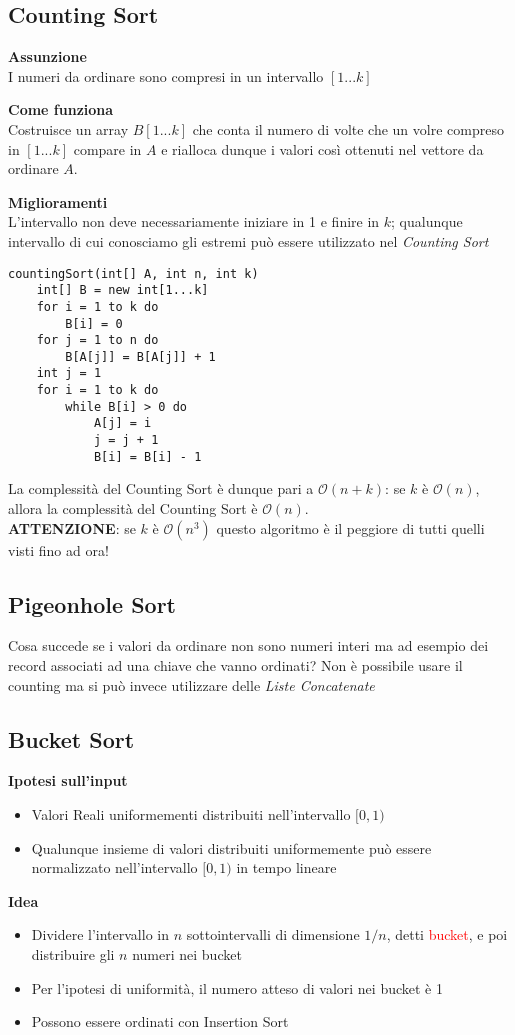 \documentclass[../cheatSheetAlgoritmi.tex]{subfiles}
\begin{document}
\subsection{Counting Sort}
\textbf{Assunzione}\\
I numeri da ordinare sono compresi in un intervallo $[1...k]$

\bigskip
\textbf{Come funziona}\\
Costruisce un array $B[1...k]$ che conta il numero di volte che un volre compreso in $[1...k]$ compare in $A$ e rialloca dunque i valori così ottenuti nel vettore da ordinare $A$.

\bigskip
\textbf{Miglioramenti}\\
L'intervallo non deve necessariamente iniziare in 1 e finire in $k$; qualunque intervallo di cui conosciamo gli estremi può essere utilizzato nel \emph{Counting Sort}
\begin{lstlisting}[caption=Counting Sort]
countingSort(int[] A, int n, int k)
	int[] B = new int[1...k]
	for i = 1 to k do
		B[i] = 0
	for j = 1 to n do
		B[A[j]] = B[A[j]] + 1
	int j = 1
	for i = 1 to k do
		while B[i] > 0 do
			A[j] = i
			j = j + 1
			B[i] = B[i] - 1
\end{lstlisting}
La complessità del Counting Sort è dunque pari a $\mathcal{O}(n + k)$: se $k$ è $\mathcal{O}(n)$, allora la complessità del Counting Sort è $\mathcal{O}(n)$.\\
\textbf{ATTENZIONE}: se $k$ è $\mathcal{O}(n^{3})$ questo algoritmo è il peggiore di tutti quelli visti fino ad ora!

\subsection{Pigeonhole Sort}
Cosa succede se i valori da ordinare non sono numeri interi ma ad esempio dei record associati ad una chiave che vanno ordinati? Non è possibile usare il counting ma si può invece utilizzare delle \emph{Liste Concatenate}

\subsection{Bucket Sort}
\textbf{Ipotesi sull'input}
\begin{itemize}
	\item Valori Reali uniformementi distribuiti nell'intervallo $[0, 1)$
	\item Qualunque insieme di valori distribuiti uniformemente può essere normalizzato nell'intervallo $[0, 1)$ in tempo lineare
\end{itemize}
\textbf{Idea}
\begin{itemize}
	\item Dividere l'intervallo in $n$ sottointervalli di dimensione $1/n$, detti \textcolor{red}{bucket}, e poi distribuire gli $n$ numeri nei bucket
	\item Per l'ipotesi di uniformità, il numero atteso di valori nei bucket è 1
	\item Possono essere ordinati con Insertion Sort
\end{itemize}
\end{document}
